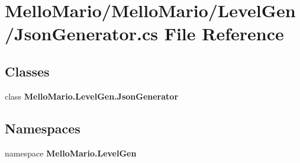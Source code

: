 \section{Mello\+Mario/\+Mello\+Mario/\+Level\+Gen/\+Json\+Generator.cs File Reference}
\label{JsonGenerator_8cs}
\subsection*{Classes}
\begin{DoxyCompactItemize}
\item 
class \textbf{ Mello\+Mario.\+Level\+Gen.\+Json\+Generator}
\end{DoxyCompactItemize}
\subsection*{Namespaces}
\begin{DoxyCompactItemize}
\item 
namespace \textbf{ Mello\+Mario.\+Level\+Gen}
\end{DoxyCompactItemize}
